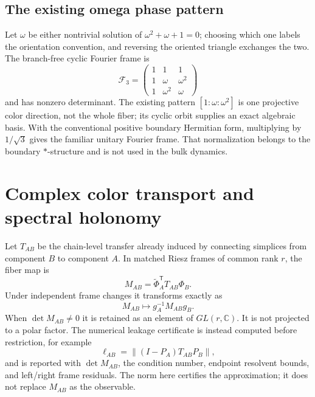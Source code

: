 \documentclass[11pt,letterpaper]{article}
\begin{document}
\subsection{The existing omega phase pattern}

Let $\omega$ be either nontrivial solution of
$\omega^2+\omega+1=0$; choosing which one labels the orientation convention,
and reversing the oriented triangle exchanges the two. The branch-free cyclic
Fourier frame is
\begin{equation*}
  \mathcal F_{3}=
  \begin{pmatrix}
    1 & 1 & 1\\
    1 & \omega & \omega^{2}\\
    1 & \omega^{2} & \omega
  \end{pmatrix}
\end{equation*}
and has nonzero determinant. The existing pattern
$[1:\omega:\omega^2]$ is one projective color direction, not the whole fiber;
its cyclic orbit supplies an exact algebraic basis. With the conventional
positive boundary Hermitian form, multiplying by $1/\sqrt3$ gives the familiar
unitary Fourier frame. That normalization belongs to the boundary
$*$-structure and is not used in the bulk dynamics.

\section{Complex color transport and spectral holonomy}
\label{sec:transport}

Let $T_{AB}$ be the chain-level transfer already induced by connecting
simplices from component $B$ to component $A$. In matched Riesz frames of
common rank $r$, the fiber map is
\begin{equation*}
  M_{AB}=\widetilde\Phi_A^{\mathsf T}T_{AB}\Phi_B .
\end{equation*}
Under independent frame changes it transforms exactly as
\begin{equation*}
  M_{AB}\longmapsto g_A^{-1}M_{AB}g_B .
\end{equation*}
When $\det M_{AB}\ne0$ it is retained as an element of
$GL(r,\mathbb C)$. It is not projected to a polar factor. The numerical
leakage certificate is instead computed before restriction, for example
\begin{equation*}
  \ell_{AB}=\|(I-P_A)T_{AB}P_B\|,
\end{equation*}
and is reported with $\det M_{AB}$, the condition number, endpoint resolvent
bounds, and left/right frame residuals. The norm here certifies the
approximation; it does not replace $M_{AB}$ as the observable.
\end{document}
